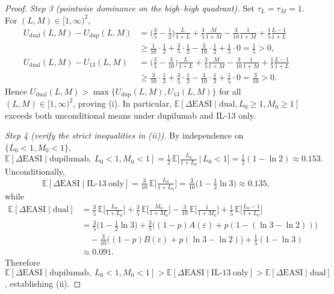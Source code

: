 \begin{proof}
\emph{Step 3 (pointwise dominance on the high--high quadrant).} Set $\tau_L=\tau_M=1$. For $(L,M)\in[1,\infty)^2$,
\[
\begin{aligned}
U_{\mathrm{dual}}(L,M)-U_{\mathrm{dup}}(L,M)
&=\Big(\tfrac{3}{5}-\tfrac12\Big)\frac{L}{1+L}+\tfrac{3}{5}\frac{M}{1+M}-\tfrac{3}{10}\frac{1}{1+M}+\tfrac{1}{5}\frac{L-1}{1+L}\\
&\ge \tfrac{1}{10}\cdot\tfrac12+\tfrac{3}{5}\cdot\tfrac12-\tfrac{3}{10}\cdot\tfrac12+\tfrac{1}{5}\cdot 0=\tfrac{1}{5}>0,\\
U_{\mathrm{dual}}(L,M)-U_{13}(L,M)
&=\Big(\tfrac{3}{5}-\tfrac{3}{10}\Big)\frac{L}{1+L}+\tfrac{3}{5}\frac{M}{1+M}-\tfrac{3}{10}\frac{1}{1+M}+\tfrac{1}{5}\frac{L-1}{1+L}\\
&\ge \tfrac{3}{10}\cdot\tfrac12+\tfrac{3}{5}\cdot\tfrac12-\tfrac{3}{10}\cdot\tfrac12+\tfrac{1}{5}\cdot 0=\tfrac{3}{10}>0.
\end{aligned}
\]
Hence $U_{\mathrm{dual}}(L,M)>\max\{U_{\mathrm{dup}}(L,M),U_{13}(L,M)\}$ for all $(L,M)\in[1,\infty)^2$, proving (i). In particular, $\mathbb{E}[\Delta\mathrm{EASI}\mid \mathrm{dual},L_0\ge 1,M_0\ge 1]$ exceeds both unconditional means under dupilumab and IL-13 only.

\emph{Step 4 (verify the strict inequalities in (ii)).} By independence on $\{L_0<1,M_0<1\}$,
\[
\mathbb{E}[\Delta\mathrm{EASI}\mid \mathrm{dupilumab},\ L_0<1,M_0<1]=\tfrac12\,\mathbb{E}\Big[\tfrac{L_0}{1+L_0}\,\Big|\,L_0<1\Big]=\tfrac12(1-\ln 2)\approx0.153.
\]
Unconditionally,
\[
\mathbb{E}[\Delta\mathrm{EASI}\mid \mathrm{IL\text{-}13\ only}]=\tfrac{3}{10}\,\mathbb{E}\Big[\tfrac{L_0}{1+L_0}\Big]=\tfrac{3}{10}\Big(1-\tfrac{1}{2}\ln 3\Big)\approx0.135,
\]
while
\[
\begin{aligned}
\mathbb{E}[\Delta\mathrm{EASI}\mid \mathrm{dual}]&=\tfrac{3}{5}\,\mathbb{E}\Big[\tfrac{L_0}{1+L_0}\Big]+\tfrac{3}{5}\,\mathbb{E}\Big[\tfrac{M_0}{1+M_0}\Big]-\tfrac{3}{10}\,\mathbb{E}\Big[\tfrac{1}{1+M_0}\Big]+\tfrac{1}{5}\,\mathbb{E}\Big[\tfrac{L_0-1}{1+L_0}\Big]\\
&=\tfrac{3}{5}\Big(1-\tfrac{1}{2}\ln3\Big)+\tfrac{3}{5}\big((1-p)A(\varepsilon)+p(1-(\ln3-\ln2))\big)\\
&\quad-\tfrac{3}{10}\big((1-p)B(\varepsilon)+p(\ln3-\ln2)\big)+\tfrac{1}{5}(1-\ln 3)\\
&\approx0.091.
\end{aligned}
\]
Therefore $\mathbb{E}[\Delta\mathrm{EASI}\mid \mathrm{dupilumab},\ L_0<1,M_0<1] > \mathbb{E}[\Delta\mathrm{EASI}\mid \mathrm{IL\text{-}13\ only}] > \mathbb{E}[\Delta\mathrm{EASI}\mid \mathrm{dual}]$, establishing (ii).


\end{proof}
